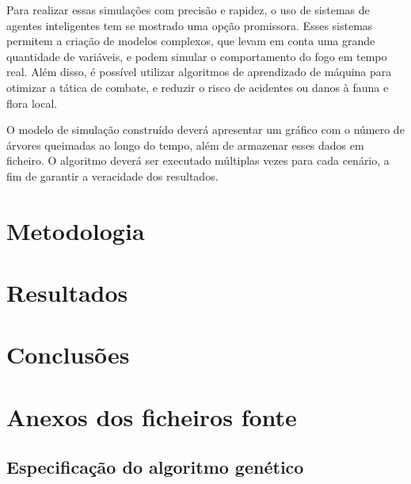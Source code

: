 \documentclass[a4paper, portuguese]{report}
\begin{document}
Para realizar essas simulações com precisão e rapidez, o uso de sistemas de agentes inteligentes tem se mostrado uma opção promissora. Esses sistemas permitem a criação de modelos complexos, que levam em conta uma grande quantidade de variáveis, e podem simular o comportamento do fogo em tempo real. Além disso, é possível utilizar algoritmos de aprendizado de máquina para otimizar a tática de combate, e reduzir o risco de acidentes ou danos à fauna e flora local.

O modelo de simulação construído deverá apresentar um gráfico com o número de árvores queimadas ao longo do tempo, além de armazenar esses dados em ficheiro. O algoritmo deverá ser executado múltiplas vezes para cada cenário, a fim de garantir a veracidade  dos resultados.

\chapter{Metodologia}\label{chapter:methodology}


\chapter{Resultados}\label{chapter:results}


\chapter{Conclusões}


\appendix
\chapter{Anexos dos ficheiros fonte}\label{chapter:appendix}
\section{Especificação do algoritmo genético}\label{sec:model_spec}
\inputminted[breaklines]{python}{src/genalg.py}



\end{document}
